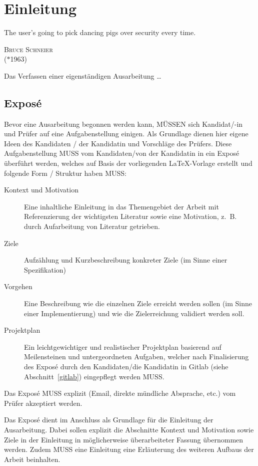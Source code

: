 \chapter{Einleitung}

\epigraph{\glqq The user's going to pick dancing pigs over security every time.\grqq\bigskip}
{\textsc{Bruce Schneier}\\ ($\ast$1963)}

\noindent
Das Verfassen einer eigenständigen Ausarbeitung \dots
\indent

\section{Expos\'{e}}
\label{intro}

Bevor eine Ausarbeitung begonnen werden kann, MÜSSEN sich Kan\-di\-dat/-in und Prüfer
auf eine Aufgabenstellung einigen. Als Grundlage dienen hier eigene Ideen des Kandidaten / der
Kandidatin und Vorschläge des Prüfers. Diese Aufgabenstellung MUSS vom Kandidaten/von der Kandidatin
in ein Expos\'{e} überführt werden, welches auf Basis der vorliegenden \LaTeX-Vorlage erstellt
und folgende Form / Struktur haben MUSS:

\begin{description}
 \item[Kontext und Motivation] Eine inhaltliche Einleitung in das Themengebiet der Arbeit
 mit Referenzierung der wichtigsten Literatur sowie eine Motivation, z.\, B. durch Aufarbeitung
 von Literatur getrieben.
 \item[Ziele] Aufzählung und Kurzbeschreibung konkreter Ziele (im Sinne einer Spezifikation)
 \item[Vorgehen] Eine Beschreibung wie die einzelnen Ziele erreicht werden sollen (im Sinne einer Implementierung)
 und wie die Zielerreichung validiert werden soll.
 \item[Projektplan] Ein leichtgewichtiger und realistischer Projektplan basierend auf Meilensteinen
 und untergeordneten Aufgaben, welcher nach Finalisierung des Expos\'{e} durch den Kandidaten/die
 Kandidatin in Gitlab (siehe Abschnitt~\ref{gitlab}) eingepflegt werden MUSS.
\end{description}

Das Expos\'{e} MUSS explizit (Email, direkte mündliche Absprache, etc.) vom Prüfer akzeptiert werden.

Das Expos\'{e} dient im Anschluss als Grundlage für die Einleitung der Ausarbeitung.
Dabei sollen explizit die Abschnitte Kontext und Motivation sowie Ziele in der Einleitung in möglicherweise
überarbeiteter Fassung übernommen werden. Zudem MUSS eine Einleitung eine Erläuterung des weiteren Aufbaus
der Arbeit beinhalten.

